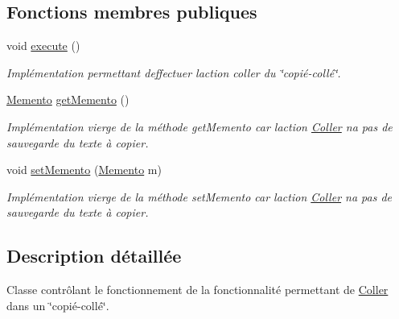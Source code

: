 \subsection*{Fonctions membres publiques}
\begin{DoxyCompactItemize}
\item 
void \hyperlink{classfr_1_1istic_1_1m1_1_1aco_1_1miniediteur_1_1v1_1_1Coller_a753fef9385eac2cc41d99bf19bd486fe}{execute} ()
\begin{DoxyCompactList}\small\item\em Implémentation permettant d\textquotesingle{}effectuer l\textquotesingle{}action coller du \char`\"{}copié-\/collé\char`\"{}. \end{DoxyCompactList}\item 
\hyperlink{interfacefr_1_1istic_1_1m1_1_1aco_1_1miniediteur_1_1v1_1_1Memento}{Memento} \hyperlink{classfr_1_1istic_1_1m1_1_1aco_1_1miniediteur_1_1v1_1_1Coller_a7ec61b1f6fcc322d4a3548e4e1461689}{get\+Memento} ()
\begin{DoxyCompactList}\small\item\em Implémentation vierge de la méthode get\+Memento car l\textquotesingle{}action \hyperlink{classfr_1_1istic_1_1m1_1_1aco_1_1miniediteur_1_1v1_1_1Coller}{Coller} n\textquotesingle{}a pas de sauvegarde du texte à copier. \end{DoxyCompactList}\item 
\mbox{\label{classfr_1_1istic_1_1m1_1_1aco_1_1miniediteur_1_1v1_1_1Coller_ae124aa0dd82f636e21afa91b01838edc}} 
void \hyperlink{classfr_1_1istic_1_1m1_1_1aco_1_1miniediteur_1_1v1_1_1Coller_ae124aa0dd82f636e21afa91b01838edc}{set\+Memento} (\hyperlink{interfacefr_1_1istic_1_1m1_1_1aco_1_1miniediteur_1_1v1_1_1Memento}{Memento} m)
\begin{DoxyCompactList}\small\item\em Implémentation vierge de la méthode set\+Memento car l\textquotesingle{}action \hyperlink{classfr_1_1istic_1_1m1_1_1aco_1_1miniediteur_1_1v1_1_1Coller}{Coller} n\textquotesingle{}a pas de sauvegarde du texte à copier. \end{DoxyCompactList}\end{DoxyCompactItemize}


\subsection{Description détaillée}
Classe contrôlant le fonctionnement de la fonctionnalité permettant de \hyperlink{classfr_1_1istic_1_1m1_1_1aco_1_1miniediteur_1_1v1_1_1Coller}{Coller} dans un \char`\"{}copié-\/collé\char`\"{}. 

